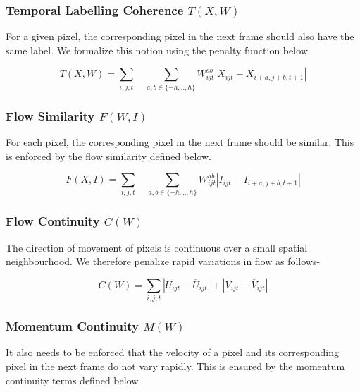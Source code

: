 \documentclass{article}
\begin{document}
\subsubsection*{Temporal Labelling Coherence $T(X,W)$}

For a given pixel, the corresponding pixel in the next frame should
also have the same label. We formalize this notion using the penalty
function below.

\begin{equation}
T(X,W)=\underset{i,j,t}{\sum}\quad\underset{a,b\in\{-h,..,h\}}{\sum}W_{ijt}^{ab}|X_{ijt}-X_{i+a,j+b,t+1}|
\end{equation}



\subsubsection*{Flow Similarity $F(W,I)$}

For each pixel, the corresponding pixel in the next frame should be
similar. This is enforced by the flow similarity defined below.

\begin{equation}
F(X,I)=\underset{i,j,t}{\sum}\quad\underset{a,b\in\{-h,..,h\}}{\sum}W_{ijt}^{ab}|I_{ijt}-I_{i+a,j+b,t+1}|
\end{equation}



\subsubsection*{Flow Continuity $C(W)$}

The direction of movement of pixels is continuous over a small spatial
neighbourhood. We therefore penalize rapid variations in flow as follows-

\begin{equation}
C(W)=\underset{i,j,t}{\sum}|U_{ijt}-\overline{U}_{ijt}|+|V_{ijt}-\overline{V}_{ijt}|
\end{equation}



\subsubsection*{Momentum Continuity $M(W)$}

It also needs to be enforced that the velocity of a pixel and its
corresponding pixel in the next frame do not vary rapidly. This is
ensured by the momentum continuity terms defined below
\end{document}
